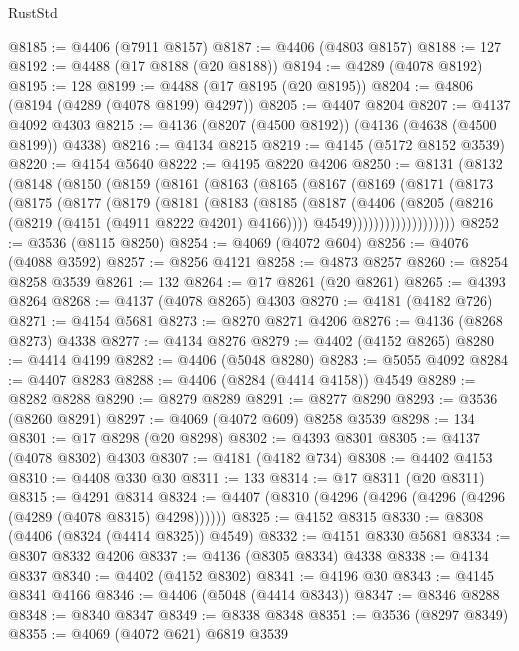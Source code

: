 \begin{lexlean}{RustStd}
\begin{coremodule}
{\begin{coremodule}
{{{{{{{{{{{{{{{{{{{{{{{{{{{{{{{{{{{{{{{{{{{{{{{{{{@8185 := @4406 (@7911 @8157)
@8187 := @4406 (@4803 @8157)
@8188 := 127
@8192 := @4488 (@17 @8188 (@20 @8188))
@8194 := @4289 (@4078 @8192)
@8195 := 128
@8199 := @4488 (@17 @8195 (@20 @8195))
@8204 := @4806 (@8194 (@4289 (@4078 @8199) @4297))
@8205 := @4407 @8204
@8207 := @4137 @4092 @4303
@8215 := @4136 (@8207 (@4500 @8192)) (@4136 (@4638 (@4500 @8199)) @4338)
@8216 := @4134 @8215
@8219 := @4145 (@5172 @8152 @3539)
@8220 := @4154 @5640
@8222 := @4195 @8220 @4206
@8250 := @8131
    (@8132
      (@8148
        (@8150
          (@8159
            (@8161
              (@8163
                (@8165
                  (@8167
                    (@8169
                      (@8171
                        (@8173
                          (@8175
                            (@8177
                              (@8179
                                (@8181
                                  (@8183
                                    (@8185
                                      (@8187
                                        (@4406
                                          (@8205 (@8216 (@8219 (@4151 (@4911 @8222 @4201) @4166))))
                                          @4549)))))))))))))))))))
@8252 := @3536 (@8115 @8250)
@8254 := @4069 (@4072 @604)
@8256 := @4076 (@4088 @3592)
@8257 := @8256 @4121
@8258 := @4873 @8257
@8260 := @8254 @8258 @3539
@8261 := 132
@8264 := @17 @8261 (@20 @8261)
@8265 := @4393 @8264
@8268 := @4137 (@4078 @8265) @4303
@8270 := @4181 (@4182 @726)
@8271 := @4154 @5681
@8273 := @8270 @8271 @4206
@8276 := @4136 (@8268 @8273) @4338
@8277 := @4134 @8276
@8279 := @4402 (@4152 @8265)
@8280 := @4414 @4199
@8282 := @4406 (@5048 @8280)
@8283 := @5055 @4092
@8284 := @4407 @8283
@8288 := @4406 (@8284 (@4414 @4158)) @4549
@8289 := @8282 @8288
@8290 := @8279 @8289
@8291 := @8277 @8290
@8293 := @3536 (@8260 @8291)
@8297 := @4069 (@4072 @609) @8258 @3539
@8298 := 134
@8301 := @17 @8298 (@20 @8298)
@8302 := @4393 @8301
@8305 := @4137 (@4078 @8302) @4303
@8307 := @4181 (@4182 @734)
@8308 := @4402 @4153
@8310 := @4408 @330 @30
@8311 := 133
@8314 := @17 @8311 (@20 @8311)
@8315 := @4291 @8314
@8324 := @4407 (@8310 (@4296 (@4296 (@4296 (@4296 (@4289 (@4078 @8315) @4298))))))
@8325 := @4152 @8315
@8330 := @8308 (@4406 (@8324 (@4414 @8325)) @4549)
@8332 := @4151 @8330 @5681
@8334 := @8307 @8332 @4206
@8337 := @4136 (@8305 @8334) @4338
@8338 := @4134 @8337
@8340 := @4402 (@4152 @8302)
@8341 := @4196 @30
@8343 := @4145 @8341 @4166
@8346 := @4406 (@5048 (@4414 @8343))
@8347 := @8346 @8288
@8348 := @8340 @8347
@8349 := @8338 @8348
@8351 := @3536 (@8297 @8349)
@8355 := @4069 (@4072 @621) @6819 @3539
}}}}}}}}}}}}}}}}}}}}}}}}}}}}}}}}}}}}}}}}}}}}}}}}}}
\end{coremodule}}
\end{coremodule}
\end{lexlean}
